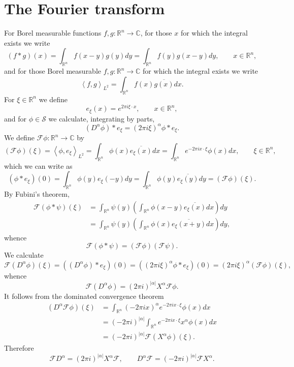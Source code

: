 \documentclass{article}
\newcommand{\inner}[2]{\left\langle #1, #2 \right\rangle}
\theoremstyle{definition}
\begin{document}
\section{The Fourier transform}
For Borel measurable functions $f,g:\mathbb{R}^n \to \mathbb{C}$, for
those $x$ for which the integral exists we write
\[
(f*g)(x) = \int_{\mathbb{R}^n} f(x-y) g(y) dy
=\int_{\mathbb{R}^n} f(y) g(x-y)dy,\qquad x \in \mathbb{R}^n,
\]
and for those Borel measurable $f,g:\mathbb{R}^n \to \mathbb{C}$ for which the integral
exists we write
\[
\inner{f}{g}_{L^2} = \int_{\mathbb{R}^n} f(x) \overline{g(x)} dx.
\]
For $\xi \in \mathbb{R}^n$ we define
\[
e_\xi(x) = e^{2\pi i\xi\cdot x},\qquad x \in \mathbb{R}^n,
\]
and for $\phi \in \mathscr{S}$ 
we calculate, integrating by parts,
\[
(D^\alpha \phi)*e_\xi = (2\pi i\xi)^{\alpha} \phi*e_\xi.
\]
We define $\mathscr{F} \phi:\mathbb{R}^n \to \mathbb{C}$ by
\[
(\mathscr{F} \phi)(\xi) =
\inner{\phi}{e_\xi}_{L^2}=
 \int_{\mathbb{R}^n} \phi(x) \overline{e_\xi(x)} dx
=\int_{\mathbb{R}^n}  e^{-2\pi ix \cdot \xi} \phi(x)  dx,
\qquad \xi \in \mathbb{R}^n,
\]
which we can write as
\[
(\phi*e_\xi)(0)=\int_{\mathbb{R}^n} \phi(y) e_\xi(-y) dy
=\int_{\mathbb{R}^n} \phi(y) \overline{e_\xi(y)} dy
=(\mathscr{F} \phi)(\xi).
\]
By Fubini's theorem,
\begin{align*}
\mathscr{F}(\phi*\psi)(\xi)&=
\int_{\mathbb{R}^n} \psi(y) \left( \int_{\mathbb{R}^n} \phi(x-y) \overline{e_\xi(x)} dx
\right) dy\\
&=\int_{\mathbb{R}^n} \psi(y) \left( \int_{\mathbb{R}^n} \phi(x) \overline{e_\xi(x+y)} dx\right)
dy,
\end{align*}
whence
\[
\mathscr{F}(\phi*\psi)=(\mathscr{F}\phi)(\mathscr{F}\psi).
\]
 We calculate
\[
\mathscr{F}(D^\alpha \phi)(\xi)=((D^\alpha \phi)*e_\xi)(0)
=((2\pi i\xi)^{\alpha} \phi*e_\xi)(0)
=(2\pi i\xi)^{\alpha} (\mathscr{F}\phi)(\xi),
\]
whence 
\[
\mathscr{F}(D^\alpha \phi) = (2\pi i)^{|\alpha|} X^\alpha \mathscr{F}\phi.
\]
It follows from the dominated convergence theorem 
\begin{align*}
(D^\alpha \mathscr{F}\phi)(\xi) &= \int_{\mathbb{R}^n} (-2\pi ix)^\alpha e^{-2\pi ix\cdot \xi} \phi(x) dx\\
&=(-2\pi i)^{|\alpha|} \int_{\mathbb{R}^n} e^{-2\pi ix\cdot \xi} x^\alpha \phi(x) dx\\
&=(-2\pi i)^{|\alpha|} \mathscr{F}(X^\alpha \phi)(\xi).
\end{align*}
Therefore
\begin{equation}
\mathscr{F} D^\alpha = (2\pi i)^{|\alpha|} X^\alpha \mathscr{F},
\qquad D^\alpha \mathscr{F} = (-2\pi i)^{|\alpha|} \mathscr{F} X^\alpha.
\label{identities}
\end{equation}
\end{document}
